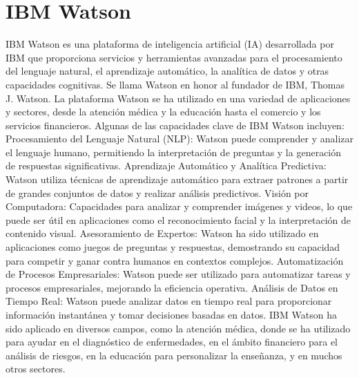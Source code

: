 \section{IBM Watson}
IBM Watson es una plataforma de inteligencia artificial (IA) desarrollada por IBM que proporciona servicios y herramientas avanzadas para el procesamiento del lenguaje natural, el aprendizaje automático, la analítica de datos y otras capacidades cognitivas. Se llama Watson en honor al fundador de IBM, Thomas J. Watson. La plataforma Watson se ha utilizado en una variedad de aplicaciones y sectores, desde la atención médica y la educación hasta el comercio y los servicios financieros.
Algunas de las capacidades clave de IBM Watson incluyen:
Procesamiento del Lenguaje Natural (NLP): Watson puede comprender y analizar el lenguaje humano, 
permitiendo la interpretación de preguntas y la generación de respuestas significativas.
Aprendizaje Automático y Analítica Predictiva: Watson utiliza técnicas de aprendizaje automático 
para extraer patrones a partir de grandes conjuntos de datos y realizar análisis predictivos.
Visión por Computadora: Capacidades para analizar y comprender imágenes y videos, lo que puede 
ser útil en aplicaciones como el reconocimiento facial y la interpretación de contenido visual.
Asesoramiento de Expertos: Watson ha sido utilizado en aplicaciones como juegos de preguntas y 
respuestas, demostrando su capacidad para competir y ganar contra humanos en contextos complejos.
Automatización de Procesos Empresariales: Watson puede ser utilizado para automatizar tareas y 
procesos empresariales, mejorando la eficiencia operativa.
Análisis de Datos en Tiempo Real: Watson puede analizar datos en tiempo real para proporcionar 
información instantánea y tomar decisiones basadas en datos.
IBM Watson ha sido aplicado en diversos campos, como la atención médica, donde se ha utilizado 
para ayudar en el diagnóstico de enfermedades, en el ámbito financiero para el análisis de riesgos, 
en la educación para personalizar la enseñanza, y en muchos otros sectores.
